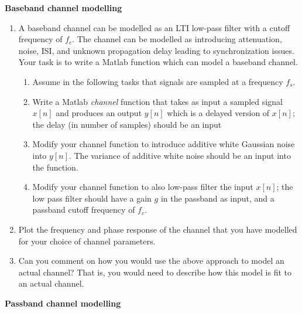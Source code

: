 \textbf{Baseband channel modelling}
\begin{enumerate}
\item A baseband channel can be modelled as an LTI low-pass filter with a cutoff frequency of $f_{c}$. The channel can be modelled as introducing attenuation, noise, ISI, and unknown propagation delay leading to synchronization issues. Your task is to write a Matlab function which can model a baseband channel.
\begin{enumerate}
\item Assume in the following tasks that signals are sampled at a frequency $f_{s}$.
\item Write a Matlab \emph{channel} function that takes as input a sampled signal $x[n]$ and produces an output $y[n]$ which is a delayed version of $x[n]$; the delay (in number of samples) should be an input
\item Modify your channel function to introduce additive white Gaussian noise into $y[n]$. The variance of additive white noise should be an input into the function.
\item Modify your channel function to also low-pass filter the input $x[n]$; the low pass filter should have a gain $g$ in the passband as input, and a passband cutoff frequency of $f_{c}$.
\end{enumerate}
\item Plot the frequency and phase response of the channel that you have modelled for your choice of channel parameters.
\item Can you comment on how you would use the above approach to model an actual channel? That is, you would need to describe how this model is fit to an actual channel.
\end{enumerate}
\myhrule 
\noindent
\textbf{Passband channel modelling}
